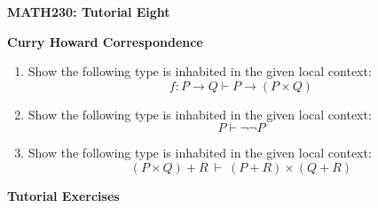 \documentclass[11pt]{report}
\begin{document}
	
	
\begin{center}
	{\bf MATH230: Tutorial Eight}
\end{center}
\begin{center}
	{\bf Curry Howard Correspondence}
\end{center}


\noindent{}
\newline
\vspace{0.5cm}


\begin{enumerate}

	\item Show the following type is inhabited in the given local context:
	$$ f : P\rightarrow  Q \vdash  P\rightarrow ( P\times  Q)$$
	
	\vspace{3cm}

	\item Show the following type is inhabited in the given local context:
	$$ P\vdash \lnot \lnot  P$$
	
	\vspace{3cm}

	\item Show the following type is inhabited in the given local context:
	$$( P\times  Q) +  R \ \vdash \ ( P + R) \times (Q + R)$$

\end{enumerate}

\newpage
{\bf Tutorial Exercises}
\end{document}
